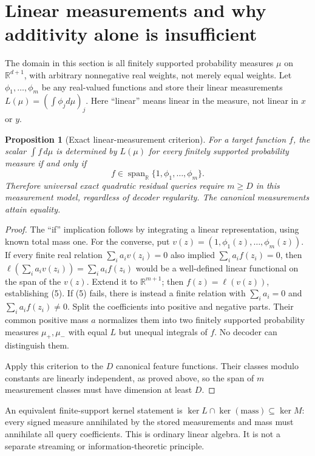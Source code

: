 \documentclass[11pt]{article}
\newtheorem{proposition}[theorem]{Proposition}
\newcommand{\R}{\mathbb R}
\begin{document}
\section{Linear measurements and why additivity alone is insufficient}

The domain in this section is all finitely supported probability
measures $\mu$ on $\R^{d+1}$, with arbitrary nonnegative real weights,
not merely equal weights. Let $\phi_1,\ldots,\phi_m$ be any real-valued
functions and store their linear measurements $L(\mu)=(\int\phi_jd\mu)_j$.
Here ``linear'' means linear in the measure, not linear in $x$ or $y$.

\begin{proposition}[Exact linear-measurement criterion]
For a target function $f$, the scalar $\int f\,d\mu$ is determined
by $L(\mu)$ for every finitely supported probability measure if and
only if
\[
 f\in\operatorname{span}_{\R}\{1,\phi_1,\ldots,\phi_m\}.
 \tag{5}
\]
Therefore universal exact quadratic residual queries require
$m\ge D$ in this measurement model, regardless of decoder regularity.
The canonical measurements attain equality.
\end{proposition}
\begin{proof}
The ``if'' implication follows by integrating a linear representation,
using known total mass one. For the converse, put
$v(z)=(1,\phi_1(z),\ldots,\phi_m(z))$. If every finite real relation
$\sum_i a_iv(z_i)=0$ also implied $\sum_i a_if(z_i)=0$, then
$\ell(\sum_i a_iv(z_i))=\sum_i a_if(z_i)$ would be a well-defined
linear functional on the span of the $v(z)$. Extend it to $\R^{m+1}$;
then $f(z)=\ell(v(z))$, establishing (5).
If (5) fails, there is instead a finite relation with
$\sum_i a_i=0$ and $\sum_i a_if(z_i)\ne0$. Split the coefficients
into positive and negative parts. Their common positive mass $a$
normalizes them into two finitely supported probability measures
$\mu_+,\mu_-$ with equal $L$ but unequal integrals of $f$.
No decoder can distinguish them.

Apply this criterion to the $D$ canonical feature functions. Their
classes modulo constants are linearly independent, as proved above,
so the span of $m$ measurement classes must have dimension at least
$D$.
\end{proof}

An equivalent finite-support kernel statement is
$\ker L\cap\ker(\text{mass})\subseteq\ker M$: every signed measure
annihilated by the stored measurements and mass must annihilate all
query coefficients. This is ordinary linear algebra. It is not a
separate streaming or information-theoretic principle.
\end{document}

